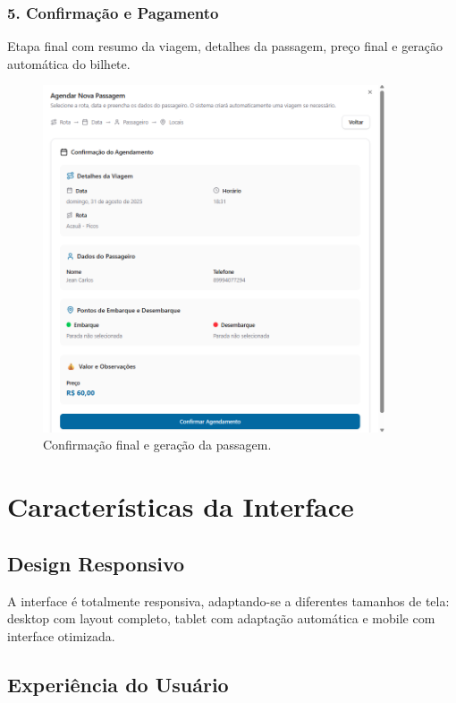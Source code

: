 \subsubsection{5. Confirmação e Pagamento}

Etapa final com resumo da viagem, detalhes da passagem, preço final e geração automática do bilhete.

\begin{figure}[H]
  \centering
  \includegraphics[width=0.9\textwidth]{imagens/wizard-confirmacao.png}
  \caption{Confirmação final e geração da passagem.}
  \label{fig:wizard-confirmacao}
\end{figure}

\section{Características da Interface}

\subsection{Design Responsivo}

A interface é totalmente responsiva, adaptando-se a diferentes tamanhos de tela: desktop com layout completo, tablet com adaptação automática e mobile com interface otimizada.

\subsection{Experiência do Usuário}

